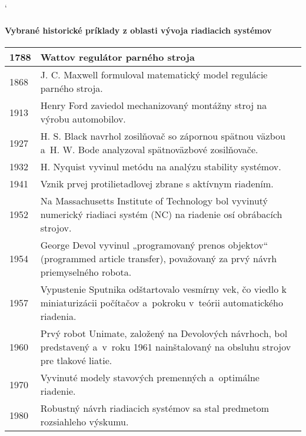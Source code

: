 \documentclass[a4paper, 10pt, ]{article}
\begin{document}
\begin{flushleft}
    \catcode`


\paragraph{Vybrané historické príklady z oblasti vývoja riadiacich systémov \cite{Bishop2022}}

\setlength\LTleft{0pt}
\setlength\LTright{0pt}

\begin{longtable}{  @{}  l @{\extracolsep{\fill}} p{}<{\raggedright} @{}   }



    \toprule
    1788 & Wattov regulátor parného stroja \\ \midrule
    1868 & J. C. Maxwell formuloval matematický model regulácie parného stroja. \\  \midrule
    1913 & Henry Ford zaviedol mechanizovaný montážny stroj na výrobu automobilov. \\  \midrule
    1927 & H. S. Black navrhol zosilňovač so zápornou spätnou väzbou a~H. W. Bode analyzoval spätnoväzbové zosilňovače. \\  \midrule
    1932 & H. Nyquist vyvinul metódu na analýzu stability systémov. \\  \midrule
    1941 & Vznik prvej protilietadlovej zbrane s aktívnym riadením. \\  \midrule
    1952 & Na Massachusetts Institute of Technology bol vyvinutý numerický riadiaci systém (NC) na riadenie osí obrábacích strojov. \\  \midrule
    1954 & George Devol vyvinul „programovaný prenos objektov“ (programmed article transfer),  považovaný za prvý návrh priemyselného robota. \\  \midrule
    1957 & Vypustenie Sputnika odštartovalo vesmírny vek, čo viedlo k miniaturizácii počítačov a~pokroku v~teórii automatického riadenia. \\  \midrule
    1960 & Prvý robot Unimate, založený na Devolových návrhoch, bol predstavený a~v~roku 1961 nainštalovaný na obsluhu strojov pre tlakové liatie. \\  \midrule
    1970 & Vyvinuté modely stavových premenných a~optimálne riadenie. \\ \midrule
    1980 & Robustný návrh riadiacich systémov sa stal predmetom rozsiahleho výskumu. \\  \midrule

\end{longtable}
\end{flushleft}
\end{document}
